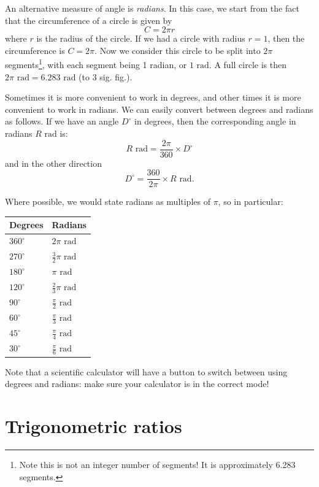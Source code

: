 \documentclass[
]{book}
\theoremstyle{definition}
\theoremstyle{definition}
\theoremstyle{definition}
\theoremstyle{definition}
\theoremstyle{remark}
\begin{document}
An alternative measure of angle is \emph{radians}. In this case, we start from the fact that the circumference of a circle is given by
\[
C=2\pi r
\]
where \(r\) is the radius of the circle. If we had a circle with radius \(r=1\), then the circumference is \(C=2\pi\). Now we consider this circle to be split into \(2\pi\) segments\footnote{Note this is not an integer number of segments! It is approximately 6.283 segments.}, with each segment being 1 radian, or \(1 \text{ rad}\). A full circle is then \(2\pi \text{ rad} = 6.283 \text{ rad}\) (to 3 sig. fig.).

Sometimes it is more convenient to work in degrees, and other times it is more convenient to work in radians. We can easily convert between degrees and radians as follows. If we have an angle \(D^\circ\) in degrees, then the corresponding angle in radians \(R \text{ rad}\) is:
\[
R \text{ rad}=\frac{2\pi}{360}\times D^\circ
\]
and in the other direction
\[
D^\circ=\frac{360}{2\pi}\times R \text{ rad}.
\]

Where possible, we would state radians as multiples of \(\pi\), so in particular:

\begin{longtable}[]{@{}ll@{}}
\toprule()
Degrees & Radians \\
\midrule()
\endhead
\(360^\circ\) & \(2\pi\text{ rad}\) \\
\(270^\circ\) & \(\frac{3}{2}\pi\text{ rad}\) \\
\(180^\circ\) & \(\pi\text{ rad}\) \\
\(120^\circ\) & \(\frac{2}{3}\pi\text{ rad}\) \\
\(90^\circ\) & \(\frac{\pi}{2}\text{ rad}\) \\
\(60^\circ\) & \(\frac{\pi}{3}\text{ rad}\) \\
\(45^\circ\) & \(\frac{\pi}{4}\text{ rad}\) \\
\(30^\circ\) & \(\frac{\pi}{6}\text{ rad}\) \\
\bottomrule()
\end{longtable}

Note that a scientific calculator will have a button to switch between using degrees and radians: make sure your calculator is in the correct mode!

\hypertarget{trigonometric-ratios}{%
\section{Trigonometric ratios}\label{trigonometric-ratios}}
\end{document}
